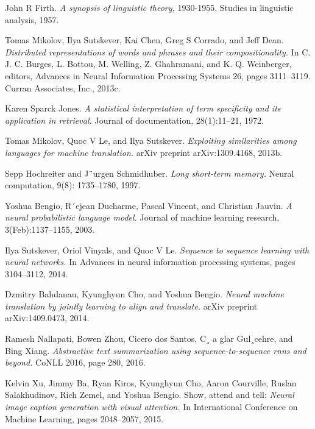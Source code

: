 \documentclass[11pt]{article}
\begin{document}
\pagebreak
\medskip
\begin{thebibliography}{9}
{} 

John R Firth.
\textit{A synopsis of linguistic theory,}  1930-1955. Studies in linguistic analysis, 1957.

Tomas Mikolov, Ilya Sutskever, Kai Chen, Greg S Corrado, and Jeff Dean. \textit{ Distributed representations of words and phrases and their compositionality.} 
In C. J. C. Burges, L. Bottou, M. Welling, Z. Ghahramani, and K. Q. Weinberger, editors, Advances in Neural Information
Processing Systems 26, pages 3111–3119. Curran Associates, Inc., 2013c.

Karen Sparck Jones. \textit{A statistical interpretation of term specificity and its application in retrieval.}
Journal of documentation, 28(1):11–21, 1972.

Tomas Mikolov, Quoc V Le, and Ilya Sutskever. \textit{Exploiting similarities among languages for machine
translation.} arXiv preprint arXiv:1309.4168, 2013b.

Sepp Hochreiter and J¨urgen Schmidhuber. \textit{Long short-term memory.} Neural computation, 9(8):
1735–1780, 1997.

Yoshua Bengio, R´ejean Ducharme, Pascal Vincent, and Christian Jauvin. \textit{A neural probabilistic
language model.} Journal of machine learning research, 3(Feb):1137–1155, 2003.

Ilya Sutskever, Oriol Vinyals, and Quoc V Le. \textit{Sequence to sequence learning with neural networks.}
In Advances in neural information processing systems, pages 3104–3112, 2014.

Dzmitry Bahdanau, Kyunghyun Cho, and Yoshua Bengio. \textit{Neural machine translation by jointly
learning to align and translate.} arXiv preprint arXiv:1409.0473, 2014.


Ramesh Nallapati, Bowen Zhou, Cicero dos Santos, C¸ a glar Gul¸cehre, and Bing Xiang. \textit{ Abstractive
text summarization using sequence-to-sequence rnns and beyond.} CoNLL 2016, page 280, 2016.

Kelvin Xu, Jimmy Ba, Ryan Kiros, Kyunghyun Cho, Aaron Courville, Ruslan Salakhudinov, Rich
Zemel, and Yoshua Bengio. Show, attend and tell: \textit{Neural image caption generation with visual
attention.} In International Conference on Machine Learning, pages 2048–2057, 2015.



\end{thebibliography}
\end{document}
